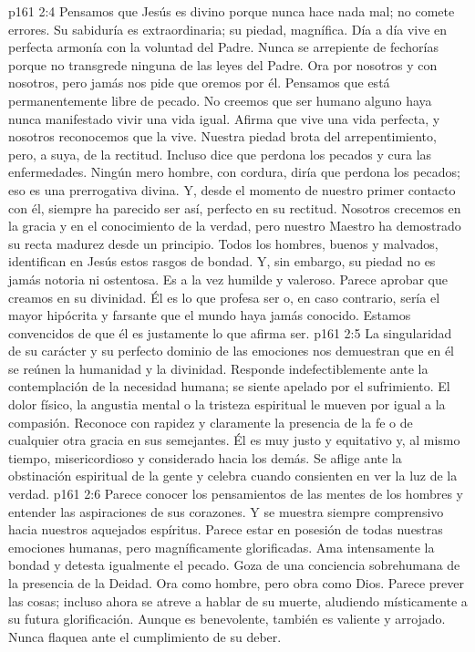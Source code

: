 \vs p161 2:4 Pensamos que Jesús es divino porque nunca hace nada mal; no comete errores. Su sabiduría es extraordinaria; su piedad, magnífica. Día a día vive en perfecta armonía con la voluntad del Padre. Nunca se arrepiente de fechorías porque no transgrede ninguna de las leyes del Padre. Ora por nosotros y con nosotros, pero jamás nos pide que oremos por él. Pensamos que está permanentemente libre de pecado. No creemos que ser humano alguno haya nunca manifestado vivir una vida igual. Afirma que vive una vida perfecta, y nosotros reconocemos que la vive. Nuestra piedad brota del arrepentimiento, pero, a suya, de la rectitud. Incluso dice que perdona los pecados y cura las enfermedades. Ningún mero hombre, con cordura, diría que perdona los pecados; eso es una prerrogativa divina. Y, desde el momento de nuestro primer contacto con él, siempre ha parecido ser así, perfecto en su rectitud. Nosotros crecemos en la gracia y en el conocimiento de la verdad, pero nuestro Maestro ha demostrado su recta madurez desde un principio. Todos los hombres, buenos y malvados, identifican en Jesús estos rasgos de bondad. Y, sin embargo, su piedad no es jamás notoria ni ostentosa. Es a la vez humilde y valeroso. Parece aprobar que creamos en su divinidad. Él es lo que profesa ser o, en caso contrario, sería el mayor hipócrita y farsante que el mundo haya jamás conocido. Estamos convencidos de que él es justamente lo que afirma ser.
\vs p161 2:5 La singularidad de su carácter y su perfecto dominio de las emociones nos demuestran que en él se reúnen la humanidad y la divinidad. Responde indefectiblemente ante la contemplación de la necesidad humana; se siente apelado por el sufrimiento. El dolor físico, la angustia mental o la tristeza espiritual le mueven por igual a la compasión. Reconoce con rapidez y claramente la presencia de la fe o de cualquier otra gracia en sus semejantes. Él es muy justo y equitativo y, al mismo tiempo, misericordioso y considerado hacia los demás. Se aflige ante la obstinación espiritual de la gente y celebra cuando consienten en ver la luz de la verdad.
\vs p161 2:6 Parece conocer los pensamientos de las mentes de los hombres y entender las aspiraciones de sus corazones. Y se muestra siempre comprensivo hacia nuestros aquejados espíritus. Parece estar en posesión de todas nuestras emociones humanas, pero magníficamente glorificadas. Ama intensamente la bondad y detesta igualmente el pecado. Goza de una conciencia sobrehumana de la presencia de la Deidad. Ora como hombre, pero obra como Dios. Parece prever las cosas; incluso ahora se atreve a hablar de su muerte, aludiendo místicamente a su futura glorificación. Aunque es benevolente, también es valiente y arrojado. Nunca flaquea ante el cumplimiento de su deber.
